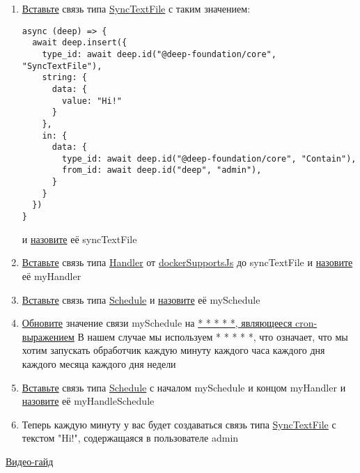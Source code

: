 \begin{enumerate}
  \item \hyperlink{DeepCase.InsertLink.Description}{Вставьте} связь типа
        \hyperlink{Core.SyncTextFile.Description}{SyncTextFile} с таким
        значением:
        \begin{lstlisting}
async (deep) => {
  await deep.insert({
    type_id: await deep.id("@deep-foundation/core", "SyncTextFile"),
    string: {
      data: {
        value: "Hi!"
      }
    },
    in: {
      data: {
        type_id: await deep.id("@deep-foundation/core", "Contain"),
        from_id: await deep.id("deep", "admin"),
      }
    }
  })
}
    \end{lstlisting}
        и \hyperlink{FAQ.HowToSetName}{назовите} её syncTextFile
  \item \hyperlink{DeepCase.InsertLink.Description}{Вставьте} связь типа
        \hyperlink{Core.Handler.Description}{Handler} от
        \hyperlink{Core.dockerSupportsJs.Description}{dockerSupportsJs}
        до syncTextFile и \hyperlink{FAQ.HowToSetName}{назовите} её
        myHandler
  \item \hyperlink{DeepCase.InsertLink.Description}{Вставьте} связь
        типа \hyperlink{Core.Schedule.Description}{Schedule} и
        \hyperlink{FAQ.HowToSetName}{назовите} её mySchedule
  \item \hyperlink{DeepCase.UpdateLink.Description}{Обновите}
        значение связи mySchedule на
        \hyperlink{Handler.Schedule.CronExpression.Description}{* * * * *,
          являющееся
          cron-выражением}
        В нашем случае мы используем * * * * *, что означает, что мы хотим
        запускать обработчик каждую минуту каждого часа каждого дня каждого
        месяца
        каждого дня недели
  \item \hyperlink{DeepCase.InsertLink.Description}{Вставьте} связь
        типа \hyperlink{Core.HandleSchedule.Description}{Schedule} с
        началом mySchedule
        и концом myHandler	и \hyperlink{FAQ.HowToSetName}{назовите} её
        myHandleSchedule
  \item Теперь каждую минуту у вас будет создаваться связь типа
        \hyperlink{Core.SyncTextFile.Description}{SyncTextFile} с текстом
        "Hi!",
        содержащаяся в пользователе admin
\end{enumerate}
\href{https://youtu.be/NZEf0VDJAgQ}{Видео-гайд}